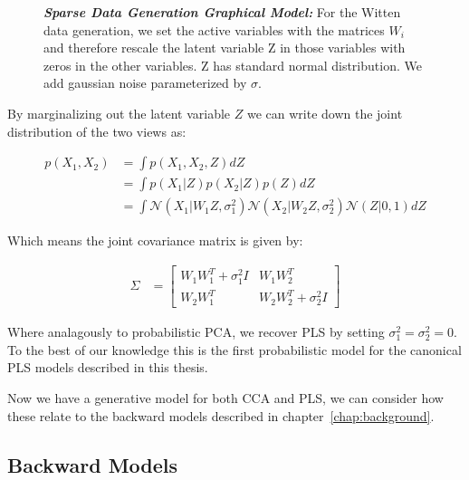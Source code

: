 \begin{figure}
\centering
 \caption[Sparse Data Generation Graphical Model]{\textit{\textbf{Sparse Data Generation Graphical Model: }}For the Witten data generation, we set the active variables with the matrices $W_i$ and therefore rescale the latent variable Z in those variables with zeros in the other variables. Z has standard normal distribution. We add gaussian noise parameterized by $\sigma$.}
 \label{fig:wittengraphical}
\end{figure}

By marginalizing out the latent variable $Z$ we can write down the joint distribution of the two views as:

\begin{align}
    p(X_1,X_2) &= \int p(X_1,X_2,Z) dZ \\
    &= \int p(X_1|Z)p(X_2|Z)p(Z) dZ \\
    &= \int \mathcal{N}(X_1|W_1Z,\sigma_1^2) \mathcal{N}(X_2|W_2Z,\sigma_2^2) \mathcal{N}(Z|0,1) dZ
\end{align}

Which means the joint covariance matrix is given by:

\begin{align}
    \Sigma &= \begin{bmatrix}
        W_1W_1^T + \sigma_1^2I & W_1W_2^T \\
        W_2W_1^T & W_2W_2^T + \sigma_2^2I
    \end{bmatrix}
\end{align}

Where analagously to probabilistic PCA\cite{tipping1999probabilistic}, we recover PLS by setting $\sigma_1^2 = \sigma
_2^2 = 0$.
To the best of our knowledge this is the first probabilistic model for the canonical PLS models described in this
thesis.

Now we have a generative model for both CCA and PLS, we can consider how these relate to the backward models
described in chapter~\ref{chap:background}.

\subsection{Backward Models}\label{subsec:backward-models}


